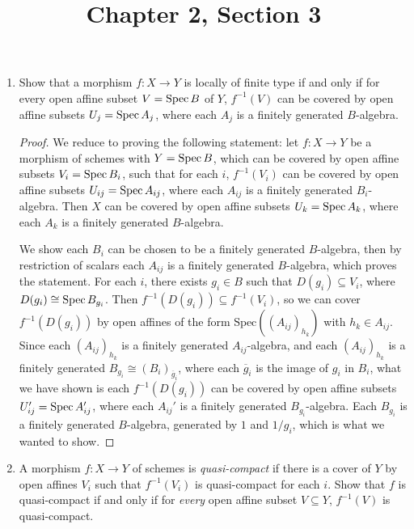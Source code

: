 \documentclass[a4paper]{article}
\title{Chapter 2, Section 3}
\begin{document}
\maketitle

\begin{enumerate} [label=\textbf{\arabic*.}, leftmargin=0em]

    \item[\textbf{1.}] Show that a morphism $f : X \to Y$ is locally of finite type if and only if for every open affine subset $V = \operatorname{Spec}{B}$ of $Y$, $f^{-1}(V)$ can be covered by open affine subsets $U_j = \operatorname{Spec}{A_j}$, where each $A_j$ is a finitely generated $B$-algebra.

          \begin{proof}
              We reduce to proving the following statement: let $f : X \to Y$ be a morphism of schemes with $Y = \operatorname{Spec}{B}$, which can be covered by open affine subsets $V_i = \operatorname{Spec}{B_i}$, such that for each $i$, $f^{-1}(V_i)$ can be covered by open affine subsets $U_{ij} = \operatorname{Spec}{A_{ij}}$, where each $A_{ij}$ is a finitely generated $B_i$-algebra. Then $X$ can be covered by open affine subsets $U_k = \operatorname{Spec}{A_k}$, where each $A_k$ is a finitely generated $B$-algebra.

              We show each $B_i$ can be chosen to be a finitely generated $B$-algebra, then by restriction of scalars each $A_{ij}$ is a finitely generated $B$-algebra, which proves the statement. For each $i$, there exists $g_i \in B$ such that $D(g_i) \subseteq V_i$, where $D(g_i) \cong \operatorname{Spec}{B_{g_i}}$. Then $f^{-1}(D(g_i)) \subseteq f^{-1}(V_i)$, so we can cover $f^{-1}(D(g_i))$ by open affines of the form $\text{Spec}((A_{ij})_{h_k})$ with $h_k \in A_{ij}$. Since each $(A_{ij})_{h_k}$ is a finitely generated $A_{ij}$-algebra, and each $(A_{ij})_{h_k}$ is a finitely generated $B_{g_i} \cong (B_i)_{\overline{g}_i}$, where each $\overline{g}_i$ is the image of $g_i$ in $B_i$, what we have shown is each $f^{-1}(D(g_i))$ can be covered by open affine subsets $U_{ij}' = \operatorname{Spec}{A'_{ij}}$, where each $A_{ij}'$ is a finitely generated $B_{g_i}$-algebra. Each $B_{g_i}$ is a finitely generated $B$-algebra, generated by $1$ and $1 / g_i$, which is what we wanted to show.
          \end{proof}

    \item[\textbf{2.}] A morphism $f : X \to Y$ of schemes is \textit{quasi-compact} if there is a cover of $Y$ by open affines $V_i$ such that $f^{-1}(V_i)$ is quasi-compact for each $i$. Show that $f$ is quasi-compact if and only if for \textit{every} open affine subset $V \subseteq Y$, $f^{-1}(V)$ is quasi-compact.


\end{enumerate}
\end{document}
